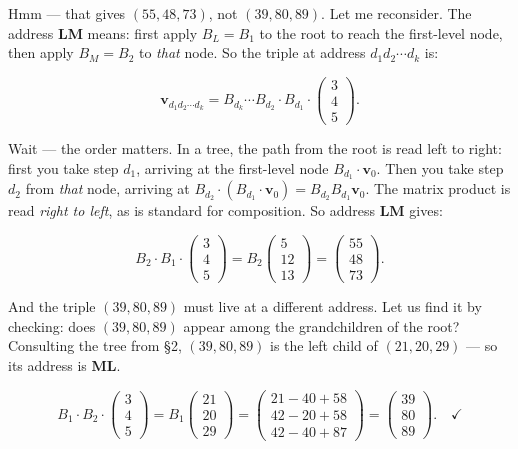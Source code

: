 Hmm --- that gives $(55, 48, 73)$, not $(39, 80, 89)$. Let me reconsider. The address \textbf{LM} means: first apply $B_L = B_1$ to the root to reach the first-level node, then apply $B_M = B_2$ to \textit{that} node. So the triple at address $d_1 d_2 \cdots d_k$ is:

\[
\mathbf{v}_{d_1 d_2 \cdots d_k} = B_{d_k} \cdots B_{d_2} \cdot B_{d_1} \cdot \begin{pmatrix} 3 \\ 4 \\ 5 \end{pmatrix}.
\]

Wait --- the order matters. In a tree, the path from the root is read left to right: first you take step $d_1$, arriving at the first-level node $B_{d_1} \cdot \mathbf{v}_0$. Then you take step $d_2$ from \textit{that} node, arriving at $B_{d_2} \cdot (B_{d_1} \cdot \mathbf{v}_0) = B_{d_2} B_{d_1} \mathbf{v}_0$. The matrix product is read \textit{right to left}, as is standard for composition. So address \textbf{LM} gives:

\[
B_2 \cdot B_1 \cdot \begin{pmatrix} 3 \\ 4 \\ 5 \end{pmatrix} = B_2 \begin{pmatrix} 5 \\ 12 \\ 13 \end{pmatrix} = \begin{pmatrix} 55 \\ 48 \\ 73 \end{pmatrix}.
\]

And the triple $(39, 80, 89)$ must live at a different address. Let us find it by checking: does $(39, 80, 89)$ appear among the grandchildren of the root? Consulting the tree from §2, $(39, 80, 89)$ is the left child of $(21, 20, 29)$ --- so its address is \textbf{ML}.

\[
B_1 \cdot B_2 \cdot \begin{pmatrix} 3 \\ 4 \\ 5 \end{pmatrix} = B_1 \begin{pmatrix} 21 \\ 20 \\ 29 \end{pmatrix} = \begin{pmatrix} 21 - 40 + 58 \\ 42 - 20 + 58 \\ 42 - 40 + 87 \end{pmatrix} = \begin{pmatrix} 39 \\ 80 \\ 89 \end{pmatrix}. \quad \checkmark
\]

